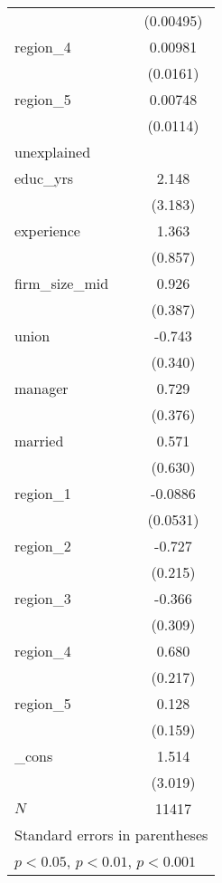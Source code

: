 {\begin{tabular}{l*{1}{c}}
            &   (0.00495)         \\
[1em]
region\_4    &     0.00981         \\
            &    (0.0161)         \\
[1em]
region\_5    &     0.00748         \\
            &    (0.0114)         \\
\hline
unexplained &                     \\
educ\_yrs    &       2.148         \\
            &     (3.183)         \\
[1em]
experience  &       1.363         \\
            &     (0.857)         \\
[1em]
firm\_size\_mid&       0.926\sym{*}  \\
            &     (0.387)         \\
[1em]
union       &      -0.743\sym{*}  \\
            &     (0.340)         \\
[1em]
manager     &       0.729         \\
            &     (0.376)         \\
[1em]
married     &       0.571         \\
            &     (0.630)         \\
[1em]
region\_1    &     -0.0886         \\
            &    (0.0531)         \\
[1em]
region\_2    &      -0.727\sym{***}\\
            &     (0.215)         \\
[1em]
region\_3    &      -0.366         \\
            &     (0.309)         \\
[1em]
region\_4    &       0.680\sym{**} \\
            &     (0.217)         \\
[1em]
region\_5    &       0.128         \\
            &     (0.159)         \\
[1em]
\_cons      &       1.514         \\
            &     (3.019)         \\
\hline
\(N\)       &       11417         \\
\hline\hline
\multicolumn{2}{l}{\footnotesize Standard errors in parentheses}\\
\multicolumn{2}{l}{\footnotesize \sym{*} \(p<0.05\), \sym{**} \(p<0.01\), \sym{***} \(p<0.001\)}\\
\end{tabular}
}
